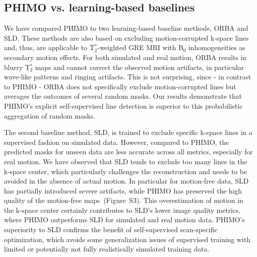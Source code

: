 \documentclass[AMA,STIX2COL]{MRM}
\newcommand{\tstar}[1]{{T$_2^*$}}
\begin{document}
\subsection{PHIMO vs. learning-based baselines}
We have compared PHIMO to two learning-based baseline methods, ORBA\cite{Oh_2021} and SLD.\cite{Oksuz_2020,Eichhorn_2023} These methods are also based on excluding motion-corrupted k-space lines and, thus, are applicable to \tstar{}-weighted GRE MRI with  B$_0$ inhomogeneities as secondary motion effects. For both simulated and real motion, ORBA results in blurry \tstar{} maps and cannot correct the observed motion artifacts, in particular wave-like patterns and ringing artifacts. This is not surprising, since - in contrast to PHIMO - ORBA does not specifically exclude motion-corrupted lines but averages the outcomes of several random masks. Our results demonstrate that PHIMO's explicit self-supervised line detection is superior to this probabilistic aggregation of random masks.

The second baseline method, SLD, is trained to exclude specific k-space lines in a supervised fashion on simulated data. However, compared to PHIMO, the predicted masks for unseen data are less accurate across all metrics, especially for real motion. We have observed that SLD tends to exclude too many lines in the k-space center, which particularly challenges the reconstruction and needs to be avoided in the absence of actual motion. In particular for motion-free data, SLD has partially introduced severe artifacts, while PHIMO has preserved the high quality of the motion-free maps~(Figure~S3). 
This overestimation of motion in the k-space center certainly contributes to SLD's lower image quality metrics, where PHIMO outperforms SLD for simulated and real motion data. PHIMO's superiority to SLD confirms the benefit of self-supervised scan-specific optimization, which avoids some generalization issues of supervised training with limited or potentially not fully realistically simulated training data.
\end{document}
